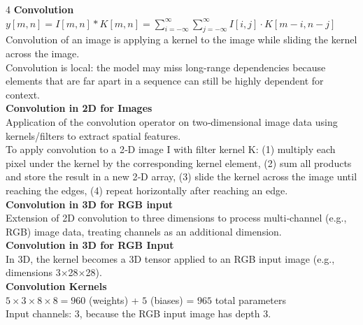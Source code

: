 \documentclass[8pt]{extarticle}
\begin{document}
\begin{multicols}{4}
\vspace{2pt}\textbf{Convolution}\\
$y[m,n] = I[m,n] * K[m,n] = \sum_{i=-\infty}^{\infty} \sum_{j=-\infty}^{\infty} I[i,j] \cdot K[m-i, n-j]$\\
Convolution of an image is applying a kernel to the image while sliding the kernel across the image.\\
Convolution is local: the model may miss long-range dependencies because elements that are far apart in a sequence can still be highly dependent for context.\\
\vspace{2pt}\textbf{Convolution in 2D for Images}\\
Application of the convolution operator on two‑dimensional image data using kernels/filters to extract spatial features.\\
To apply convolution to a 2‑D image I with filter kernel K: (1) multiply each pixel under the kernel by the corresponding kernel element, (2) sum all products and store the result in a new 2‑D array, (3) slide the kernel across the image until reaching the edges, (4) repeat horizontally after reaching an edge.\\
\vspace{2pt}\textbf{Convolution in 3D for RGB input}\\
Extension of 2D convolution to three dimensions to process multi‑channel (e.g., RGB) image data, treating channels as an additional dimension.\\
\vspace{2pt}\textbf{Convolution in 3D for RGB Input}\\
In 3D, the kernel becomes a 3D tensor applied to an RGB input image (e.g., dimensions 3×28×28).\\
\vspace{2pt}\textbf{Convolution Kernels}\\
$5 \times 3 \times 8 \times 8 = 960$ (weights) + $5$ (biases) = $965$ total parameters\\
Input channels: 3, because the RGB input image has depth 3.\\


\end{multicols}
\end{document}

